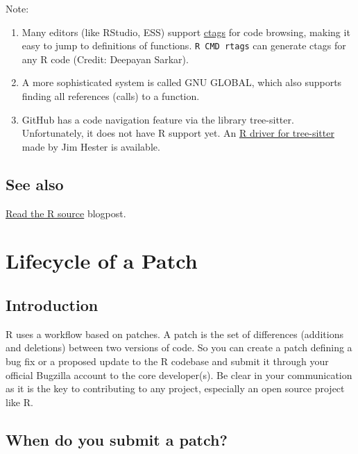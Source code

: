 \documentclass[
]{book}
\begin{document}
Note:

\begin{enumerate}
\def\labelenumi{\arabic{enumi}.}
\item
  Many editors (like RStudio, ESS) support \href{https://en.wikipedia.org/wiki/Ctags}{ctags} for code browsing, making it easy to jump to definitions of functions. \texttt{R\ CMD\ rtags} can generate ctags for any R code (Credit: Deepayan Sarkar).
\item
  A more sophisticated system is called GNU GLOBAL, which also supports
  finding all references (calls) to a function.
\item
  GitHub has a code navigation feature via the library tree-sitter. Unfortunately, it does not have R support yet. An \href{https://github.com/r-lib/tree-sitter-r}{R driver for tree-sitter} made by Jim Hester is available.
\end{enumerate}

\hypertarget{see-also-3}{%
\section{See also}\label{see-also-3}}

\href{https://blog.r-hub.io/2019/05/14/read-the-source/}{Read the R source} blogpost.

\hypertarget{FixBug}{%
\chapter{Lifecycle of a Patch}\label{FixBug}}

\hypertarget{introduction-1}{%
\section{Introduction}\label{introduction-1}}

R uses a workflow based on patches. A patch is the set of differences (additions and deletions) between two versions of code. So you can create a patch defining a bug fix or a proposed update to the R codebase and submit it through your official Bugzilla account to the core developer(s). Be clear in your communication as it is the key to contributing to any project, especially an open source project like R.

\hypertarget{when-do-you-submit-a-patch}{%
\section{When do you submit a patch?}\label{when-do-you-submit-a-patch}}
\end{document}
